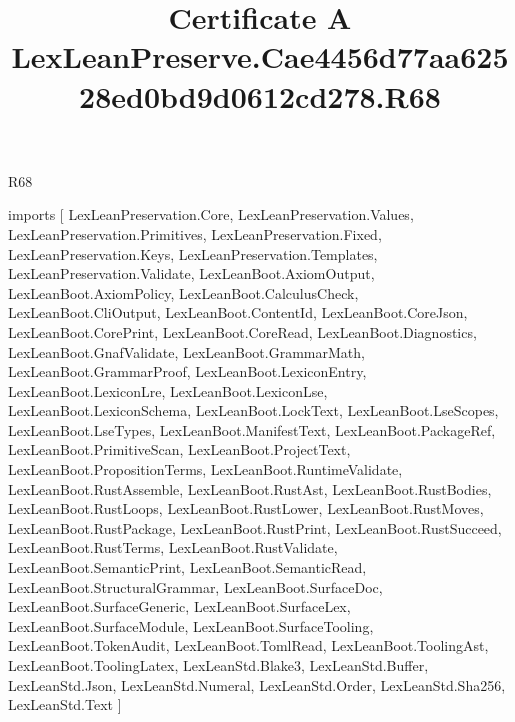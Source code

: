 \begin{lexlean}{R68}
\title{Certificate A LexLeanPreserve.Cae4456d77aa62528ed0bd9d0612cd278.R68}
\begin{coremodule}
imports [
  LexLeanPreservation.Core,
  LexLeanPreservation.Values,
  LexLeanPreservation.Primitives,
  LexLeanPreservation.Fixed,
  LexLeanPreservation.Keys,
  LexLeanPreservation.Templates,
  LexLeanPreservation.Validate,
  LexLeanBoot.AxiomOutput,
  LexLeanBoot.AxiomPolicy,
  LexLeanBoot.CalculusCheck,
  LexLeanBoot.CliOutput,
  LexLeanBoot.ContentId,
  LexLeanBoot.CoreJson,
  LexLeanBoot.CorePrint,
  LexLeanBoot.CoreRead,
  LexLeanBoot.Diagnostics,
  LexLeanBoot.GnafValidate,
  LexLeanBoot.GrammarMath,
  LexLeanBoot.GrammarProof,
  LexLeanBoot.LexiconEntry,
  LexLeanBoot.LexiconLre,
  LexLeanBoot.LexiconLse,
  LexLeanBoot.LexiconSchema,
  LexLeanBoot.LockText,
  LexLeanBoot.LseScopes,
  LexLeanBoot.LseTypes,
  LexLeanBoot.ManifestText,
  LexLeanBoot.PackageRef,
  LexLeanBoot.PrimitiveScan,
  LexLeanBoot.ProjectText,
  LexLeanBoot.PropositionTerms,
  LexLeanBoot.RuntimeValidate,
  LexLeanBoot.RustAssemble,
  LexLeanBoot.RustAst,
  LexLeanBoot.RustBodies,
  LexLeanBoot.RustLoops,
  LexLeanBoot.RustLower,
  LexLeanBoot.RustMoves,
  LexLeanBoot.RustPackage,
  LexLeanBoot.RustPrint,
  LexLeanBoot.RustSucceed,
  LexLeanBoot.RustTerms,
  LexLeanBoot.RustValidate,
  LexLeanBoot.SemanticPrint,
  LexLeanBoot.SemanticRead,
  LexLeanBoot.StructuralGrammar,
  LexLeanBoot.SurfaceDoc,
  LexLeanBoot.SurfaceGeneric,
  LexLeanBoot.SurfaceLex,
  LexLeanBoot.SurfaceModule,
  LexLeanBoot.SurfaceTooling,
  LexLeanBoot.TokenAudit,
  LexLeanBoot.TomlRead,
  LexLeanBoot.ToolingAst,
  LexLeanBoot.ToolingLatex,
  LexLeanStd.Blake3,
  LexLeanStd.Buffer,
  LexLeanStd.Json,
  LexLeanStd.Numeral,
  LexLeanStd.Order,
  LexLeanStd.Sha256,
  LexLeanStd.Text
]


\end{coremodule}
\end{lexlean}
